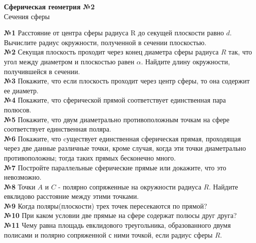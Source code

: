 


    \begin{center}
        \textbf{Сферическая геометрия №2}\\
        Сечения сферы
    \end{center}

    \textbf{№1} Расстояние от центра сферы радиуса R до секущей плоскости равно $d$.
    Вычислите радиус окружности, полученной в сечении плоскостью.\\


    \textbf{№2} Секущая плоскость проходит через конец диаметра сферы радиуса $R$ так,
    что угол между диаметром и плоскостью равен $\alpha$.
    Найдите длину окружности, получившейся в сечении.\\


    \textbf{№3} Покажите, что если плоскость проходит через центр сферы, то она содержит ее диаметр.\\


    \textbf{№4} Покажите, что сферической прямой соответствует единственная пара полюсов.\\


    \textbf{№5} Покажите, что двум диаметрально противоположным точкам на сфере соответствует единственная поляра.\\


    \textbf{№6} Покажите, что cуществует единственная сферическая прямая, проходящая через две данные различные точки,
    кроме случая, когда эти точки диаметрально противоположны;
    тогда таких прямых бесконечно много.\\


    \textbf{№7} Постройте параллельные сферические прямые или докажите, что это невозможно.\\


    \textbf{№8} Точки $A$ и $C$ - полярно сопряженные на окружности радиуса $R$.
    Найдите евклидово расстояние между этими точками.\\


    \textbf{№9} Когда поляры(плоскости) трех точек пересекаются по прямой?\\


    \textbf{№10} При каком условии две прямые на сфере содержат полюсы друг друга?\\


    \textbf{№11} Чему равна площадь евклидового треугольника, образованного двумя полисами и полярно сопряженной с ними точкой,
    если радиус сферы $R$.\\




